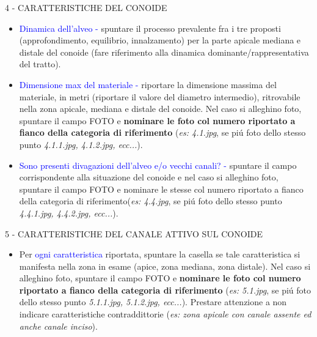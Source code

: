 \documentclass[12pt,a4paper]{article}
\begin{document}
\begin{flushleft}
\vskip 5mm
4 - CARATTERISTICHE DEL CONOIDE\\
\begin{itemize}
\item{\textcolor{blue}{Dinamica dell'alveo - }} spuntare il processo prevalente fra i tre proposti (approfondimento, equilibrio, innalzamento) per la parte apicale mediana e distale del conoide (fare riferimento alla dinamica dominante/rappresentativa del tratto).
\item{\textcolor{blue}{Dimensione max del materiale - }} riportare la dimensione massima del materiale, in metri (riportare il valore del diametro intermedio), ritrovabile nella zona apicale, mediana e distale del conoide. Nel caso si alleghino foto, spuntare il campo FOTO e \textbf{nominare le foto col numero riportato a fianco della categoria di riferimento} (\textit{es: 4.1.jpg}, se pi\'u foto dello stesso punto \textit{4.1.1.jpg, 4.1.2.jpg, ecc...}).
\item{\textcolor{blue}{Sono presenti divagazioni dell'alveo e/o vecchi canali? - }} spuntare il campo corrispondente alla situazione del conoide e nel caso si alleghino foto, spuntare il campo FOTO e nominare le stesse col numero riportato a fianco della categoria di riferimento(\textit{es: 4.4.jpg}, se pi\'u foto dello stesso punto \textit{4.4.1.jpg, 4.4.2.jpg, ecc...}).
\end{itemize}

\vskip 5mm
5 - CARATTERISTICHE DEL CANALE ATTIVO SUL CONOIDE\\
\begin{itemize}
\item{\textcolor{blue}{}} Per \textcolor{blue}{ogni caratteristica} riportata, spuntare la casella se tale caratteristica si manifesta nella zona in esame (apice, zona mediana, zona distale). Nel caso si alleghino foto, spuntare il campo FOTO e \textbf{nominare le foto col numero riportato a fianco della categoria di riferimento} (\textit{es: 5.1.jpg}, se pi\'u foto dello stesso punto \textit{5.1.1.jpg, 5.1.2.jpg, ecc...}). Prestare attenzione a non indicare caratteristiche contraddittorie (\textit{es: zona apicale con canale assente ed anche canale inciso}).
\end{itemize}


\end{flushleft}
\end{document}
